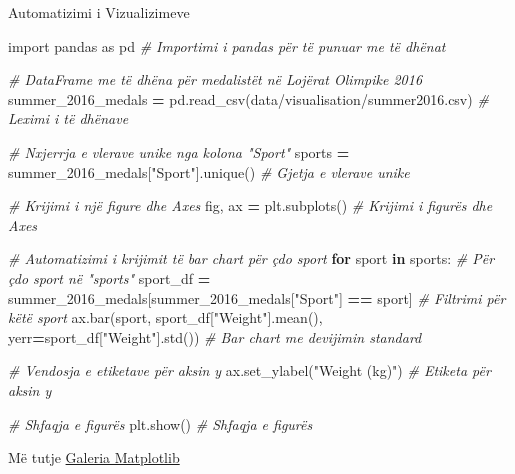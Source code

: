 \documentclass[
  ignorenonframetext,
]{beamer}
\newenvironment{Shaded}{\begin{snugshade}}{\end{snugshade}}
\newcommand{\CommentTok}[1]{\textcolor[rgb]{0.56,0.35,0.01}{\textit{#1}}}
\newcommand{\ControlFlowTok}[1]{\textcolor[rgb]{0.13,0.29,0.53}{\textbf{#1}}}
\newcommand{\ImportTok}[1]{#1}
\newcommand{\KeywordTok}[1]{\textcolor[rgb]{0.13,0.29,0.53}{\textbf{#1}}}
\newcommand{\NormalTok}[1]{#1}
\newcommand{\OperatorTok}[1]{\textcolor[rgb]{0.81,0.36,0.00}{\textbf{#1}}}
\newcommand{\StringTok}[1]{\textcolor[rgb]{0.31,0.60,0.02}{#1}}
\begin{document}
\begin{frame}[fragile]{Automatizimi i Vizualizimeve}
\protect\hypertarget{automatizimi-i-vizualizimeve-1}{}

\begin{Shaded}
\begin{Highlighting}[]
\ImportTok{import}\NormalTok{ pandas }\ImportTok{as}\NormalTok{ pd  }\CommentTok{\# Importimi i pandas për të punuar me të dhënat}

\CommentTok{\# DataFrame me të dhëna për medalistët në Lojërat Olimpike 2016}
\NormalTok{summer\_2016\_medals }\OperatorTok{=}\NormalTok{ pd.read\_csv(}\StringTok{\textquotesingle{}data/visualisation/summer2016.csv\textquotesingle{}}\NormalTok{)  }\CommentTok{\# Leximi i të dhënave}

\CommentTok{\# Nxjerrja e vlerave unike nga kolona "Sport"}
\NormalTok{sports }\OperatorTok{=}\NormalTok{ summer\_2016\_medals[}\StringTok{"Sport"}\NormalTok{].unique()  }\CommentTok{\# Gjetja e vlerave unike}

\CommentTok{\# Krijimi i një figure dhe Axes}
\NormalTok{fig, ax }\OperatorTok{=}\NormalTok{ plt.subplots()  }\CommentTok{\# Krijimi i figurës dhe Axes}

\CommentTok{\# Automatizimi i krijimit të bar chart për çdo sport}
\ControlFlowTok{for}\NormalTok{ sport }\KeywordTok{in}\NormalTok{ sports:  }\CommentTok{\# Për çdo sport në "sports"}
\NormalTok{    sport\_df }\OperatorTok{=}\NormalTok{ summer\_2016\_medals[summer\_2016\_medals[}\StringTok{"Sport"}\NormalTok{] }\OperatorTok{==}\NormalTok{ sport]  }\CommentTok{\# Filtrimi për këtë sport}
\NormalTok{    ax.bar(sport, sport\_df[}\StringTok{"Weight"}\NormalTok{].mean(), yerr}\OperatorTok{=}\NormalTok{sport\_df[}\StringTok{"Weight"}\NormalTok{].std())  }\CommentTok{\# Bar chart me devijimin standard}

\CommentTok{\# Vendosja e etiketave për aksin y}
\NormalTok{ax.set\_ylabel(}\StringTok{"Weight (kg)"}\NormalTok{)  }\CommentTok{\# Etiketa për aksin y}

\CommentTok{\# Shfaqja e figurës}
\NormalTok{plt.show()  }\CommentTok{\# Shfaqja e figurës}
\end{Highlighting}
\end{Shaded}
\end{frame}

\begin{frame}{Më tutje}
\protect\hypertarget{muxeb-tutje}{}
\href{https://matplotlib.org/2.0.2/gallery.html}{Galeria Matplotlib}
\end{frame}
\end{document}
